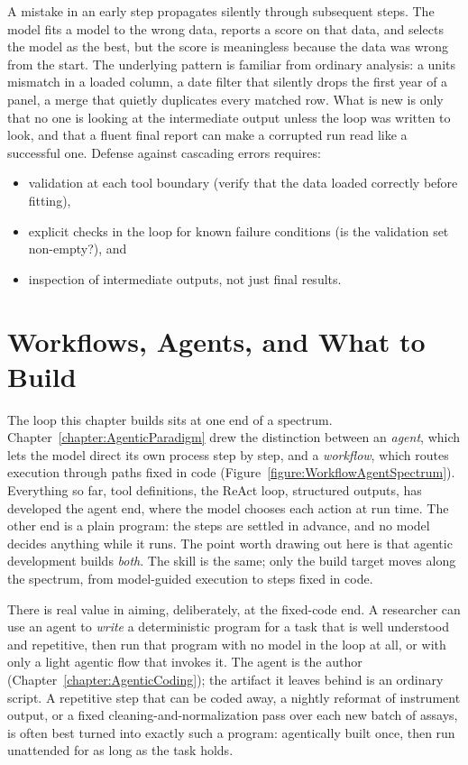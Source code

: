 A mistake in an early step propagates silently through subsequent steps.
The model fits a model to the wrong data, reports a score on that data, and selects the model as the best, but the score is meaningless because the data was wrong from the start.
The underlying pattern is familiar from ordinary analysis: a units mismatch in a loaded column, a date filter that silently drops the first year of a panel, a merge that quietly duplicates every matched row.
What is new is only that no one is looking at the intermediate output unless the loop was written to look, and that a fluent final report can make a corrupted run read like a successful one.
Defense against cascading errors requires:
\begin{itemize}
\item validation at each tool boundary (verify that the data loaded correctly before fitting),
\item explicit checks in the loop for known failure conditions (is the validation set non-empty?), and
\item inspection of intermediate outputs, not just final results.
\end{itemize}

\section{Workflows, Agents, and What to Build}
\label{section:WorkflowsAndAgents}

The loop this chapter builds sits at one end of a spectrum.
Chapter~\ref{chapter:AgenticParadigm} drew the distinction between an \emph{agent}, which lets the model direct its own process step by step, and a \emph{workflow}, which routes execution through paths fixed in code (Figure~\ref{figure:WorkflowAgentSpectrum}).
Everything so far, tool definitions, the ReAct loop, structured outputs, has developed the agent end, where the model chooses each action at run time.
The other end is a plain program: the steps are settled in advance, and no model decides anything while it runs.
The point worth drawing out here is that agentic development builds \emph{both}.
The skill is the same; only the build target moves along the spectrum, from model-guided execution to steps fixed in code.

There is real value in aiming, deliberately, at the fixed-code end.
A researcher can use an agent to \emph{write} a deterministic program for a task that is well understood and repetitive, then run that program with no model in the loop at all, or with only a light agentic flow that invokes it.
The agent is the author (Chapter~\ref{chapter:AgenticCoding}); the artifact it leaves behind is an ordinary script.
A repetitive step that can be coded away, a nightly reformat of instrument output, or a fixed cleaning-and-normalization pass over each new batch of assays, is often best turned into exactly such a program: agentically built once, then run unattended for as long as the task holds.

